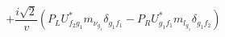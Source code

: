 %
\begin{dmath*}
%
  +  \frac{i \sqrt{2}}{v} \left(P_L U_{f_2 g_1}^* m_{\nu_{g_1}} \delta_{g_1 f_1} - P_R U_{g_1 f_1}^* m_{l_{g_1}} \delta_{g_1 f_2}\right)
%
\end{dmath*}
%
